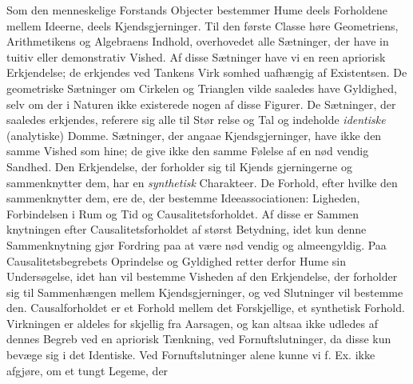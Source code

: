 \documentclass[12pt,a4paper]{book}
\begin{document}
Som den menneskelige Forstands Objecter bestemmer
Hume deels Forholdene mellem Ideerne, deels Kjendsgjerninger.
Til den første Classe høre Geometriens, Arithmetikens og
Algebraens Indhold, overhovedet alle Sætninger, der have in\-%
tuitiv eller demonstrativ Vished. Af disse Sætninger have vi
en reen apriorisk Erkjendelse; de erkjendes ved Tankens Virk\-%
somhed uafhængig af Existentsen. De geometriske Sætninger
om Cirkelen og Trianglen vilde saaledes have Gyldighed, selv
om der i Naturen ikke existerede nogen af disse Figurer.
De Sætninger, der saaledes erkjendes, referere sig alle til Stør\-%
relse og Tal og indeholde \emph{identiske} (analytiske) Domme.
Sætninger, der angaae Kjendsgjerninger, have ikke den samme
Vished som hine; de give ikke den samme Følelse af en nød\-%
vendig Sandhed. Den Erkjendelse, der forholder sig til Kjends\-%
gjerningerne og sammenknytter dem, har en \emph{synthetisk}
Charakteer. De Forhold, efter hvilke den sammenknytter dem,
ere de, der bestemme Ideeassociationen: Ligheden, Forbindelsen
i Rum og Tid og Causalitetsforholdet. Af disse er Sammen\-%
knytningen efter Causalitetsforholdet af størst Betydning, idet
kun denne Sammenknytning gjør Fordring paa at være nød\-%
vendig og almeengyldig. Paa Causalitetsbegrebets Oprindelse
og Gyldighed retter derfor Hume sin Undersøgelse, idet han
vil bestemme Visheden af den Erkjendelse, der forholder sig
til Sammenhængen mellem Kjendsgjerninger, og ved Slutninger
vil bestemme den. Causalforholdet er et Forhold mellem det
Forskjellige, et synthetisk Forhold. Virkningen er aldeles for\-%
skjellig fra Aarsagen, og kan altsaa ikke udledes af dennes
Begreb ved en apriorisk Tænkning, ved Fornuftslutninger, da
disse kun bevæge sig i det Identiske. Ved Fornuftslutninger
alene kunne vi f. Ex. ikke afgjøre, om et tungt Legeme, der
\end{document}
